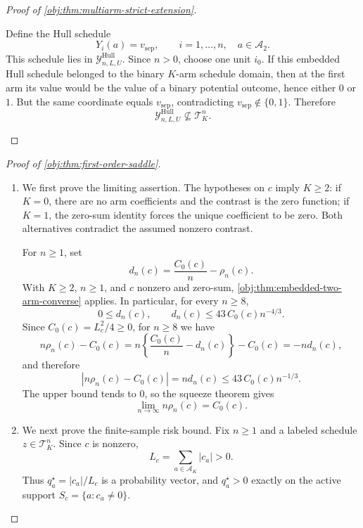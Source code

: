 \documentclass[11pt]{article}
\begin{document}
\begin{proof}[Proof of \cref{obj:thm:multiarm-strict-extension}]
\begin{enumerate}
Define the Hull schedule
\[
Y_i(a)=v_{\mathrm{sep}},
\qquad
i=1,\ldots,n,\quad a\in\mathcal A_2 .
\]
This schedule lies in \(\mathcal Y^{\mathrm{Hull}}_{n,L,U}\). Since \(n>0\), choose one unit \(i_0\). If this embedded Hull schedule belonged to the binary \(K\)-arm schedule domain, then at the first arm its value would be the value of a binary potential outcome, hence either \(0\) or \(1\). But the same coordinate equals \(v_{\mathrm{sep}}\), contradicting \(v_{\mathrm{sep}}\notin\{0,1\}\). Therefore
\[
\mathcal Y^{\mathrm{Hull}}_{n,L,U}\nsubseteq \mathcal T_K^n .
\]
\end{enumerate}
\end{proof}

\begin{proof}[Proof of \cref{obj:thm:first-order-saddle}]
\begin{enumerate}
\item We first prove the limiting assertion. The hypotheses on \(c\) imply \(K\ge 2\): if \(K=0\), there are no arm coefficients and the contrast is the zero function; if \(K=1\), the zero-sum identity forces the unique coefficient to be zero. Both alternatives contradict the assumed nonzero contrast. %

For \(n\ge 1\), set
\[
d_n(c)=\frac{C_0(c)}{n}-\rho_n(c).
\]
With \(K\ge 2\), \(n\ge 1\), and \(c\) nonzero and zero-sum, \cref{obj:thm:embedded-two-arm-converse} applies. In particular, for every \(n\ge 8\),
\[
0\le d_n(c),
\qquad
d_n(c)\le 43\,C_0(c)n^{-4/3}.
\]
Since \(C_0(c)=L_c^2/4\ge 0\), for \(n\ge 8\) we have
\[
n\rho_n(c)-C_0(c)
=
n\left\{\frac{C_0(c)}{n}-d_n(c)\right\}-C_0(c)
=
-nd_n(c),
\]
and therefore
\[
\left|n\rho_n(c)-C_0(c)\right|
=
nd_n(c)
\le
43\,C_0(c)n^{-1/3}.
\]
The upper bound tends to \(0\), so the squeeze theorem gives
\[
\lim_{n\to\infty} n\rho_n(c)=C_0(c).
\]

\item We next prove the finite-sample risk bound. Fix \(n\ge 1\) and a labeled schedule \(z\in\mathcal T_K^n\). Since \(c\) is nonzero,
\[
L_c=\sum_{a\in\mathcal A_K}|c_a|>0.
\]
Thus \(q_a^\star=|c_a|/L_c\) is a probability vector, and \(q_a^\star>0\) exactly on the active support \(S_c=\{a:c_a\ne0\}\).


\end{enumerate}
\end{proof}
\end{document}

